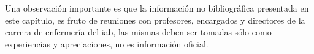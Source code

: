 Una observación importante es que la información no bibliográfica presentada 
en este capítulo, es fruto de reuniones con profesores, encargados y directores 
de la carrera de enfermería del \Gls{iab}, las mismas deben ser tomadas sólo 
como experiencias y apreciaciones, no es información oficial. 




%
%
%
%
%
%
%
%


